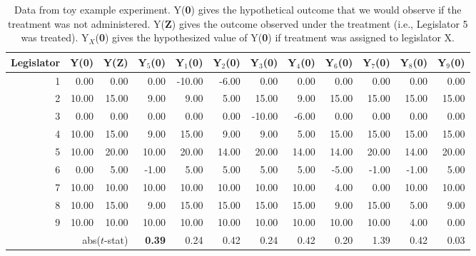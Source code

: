 \documentclass[12pt]{article}
\begin{document}
\begin{table}[ht]
{\begin{tabular}{rrrrrrrrrrrr}
   \hline
Legislator & Y({\bf 0}) & Y({\bf Z}) & Y$_5$({\bf 0}) & Y$_1$({\bf 0})  & Y$_2$({\bf 0})& Y$_3$({\bf 0})& Y$_4$({\bf 0})& Y$_6$({\bf 0})& Y$_7$({\bf 0})& Y$_8$({\bf 0})&Y$_9$({\bf 0})\\ 
  \hline
1 & 0.00 & 0.00 & 0.00 & -10.00 & -6.00 & 0.00 & 0.00 & 0.00 & 0.00 & 0.00 & 0.00 \\ 
  2 & 10.00 & 15.00 & 9.00 & 9.00 & 5.00 & 15.00 & 9.00 & 15.00 & 15.00 & 15.00 & 15.00 \\ 
  3 & 0.00 & 0.00 & 0.00 & 0.00 & 0.00 & -10.00 & -6.00 & 0.00 & 0.00 & 0.00 & 0.00 \\ 
  4 & 10.00 & 15.00 & 9.00 & 15.00 & 9.00 & 9.00 & 5.00 & 15.00 & 15.00 & 15.00 & 15.00 \\ 
  5 & 10.00 & 20.00 & 10.00 & 20.00 & 14.00 & 20.00 & 14.00 & 14.00 & 20.00 & 14.00 & 20.00 \\ 
  6 & 0.00 & 5.00 & -1.00 & 5.00 & 5.00 & 5.00 & 5.00 & -5.00 & -1.00 & -1.00 & 5.00 \\ 
  7 & 10.00 & 10.00 & 10.00 & 10.00 & 10.00 & 10.00 & 10.00 & 4.00 & 0.00 & 10.00 & 10.00 \\ 
  8 & 10.00 & 15.00 & 9.00 & 15.00 & 15.00 & 15.00 & 15.00 & 9.00 & 15.00 & 5.00 & 9.00 \\ 
  9 & 10.00 & 10.00 & 10.00 & 10.00 & 10.00 & 10.00 & 10.00 & 10.00 & 10.00 & 4.00 & 0.00 \\ \hline 
   \multicolumn{3}{r}{abs($t$-stat)}  & {\bf 0.39} & 0.24 & 0.42 & 0.24 & 0.42 & 0.20 & 1.39 & 0.42 & 0.03 \\ 
\hline \hline

\end{tabular}
}
\caption{Data from toy example experiment.  Y({\bf 0}) gives the hypothetical outcome that we would observe if the treatment was not administered. Y({\bf Z}) gives the outcome observed under the treatment (i.e., Legislator 5 was treated). Y$_X$({\bf 0}) gives the hypothesized value of Y({\bf 0}) if treatment was assigned to legislator X.}
\label{tab:ninenet}
\end{table}
\end{document}
